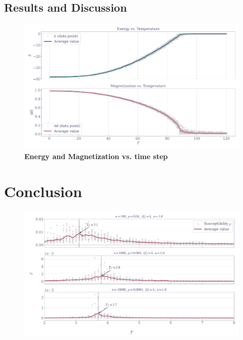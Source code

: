 \documentclass[11pt,a4paper]{article}
\begin{document}
\subsection{Results and Discussion}

\begin{figure}[ht!]
    \centering
    \caption{\textbf{Energy and Magnetization vs. time step}}
    \includegraphics[width=\linewidth]{../figures/energy_magnet_vs_temp.pdf}
\end{figure}


\section{Conclusion}

\begin{figure}[ht!]
    \includegraphics[width=\linewidth]{../figures/suscept_ER_nearest.pdf}
\end{figure}
\end{document}
